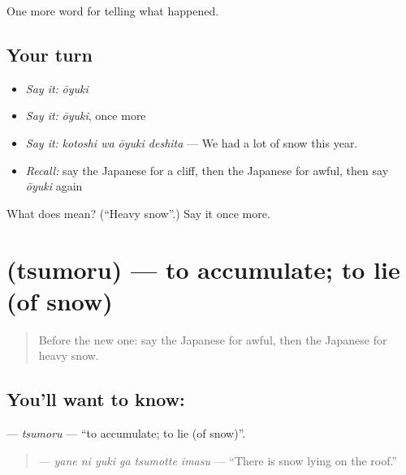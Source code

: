 \begin{grammarlens}[title={What you've built}]
One more word for telling what happened.
\end{grammarlens}

\subsection*{Your turn}
\begin{itemize}
\raggedright
  \item \emph{Say it:} \emph{ōyuki}
  \item \emph{Say it:} \emph{ōyuki}, once more
  \item \emph{Say it:} \emph{kotoshi wa ōyuki deshita} — We had a lot of snow this year.
  \item \emph{Recall:} say the Japanese for a cliff, then the Japanese for awful, then say \emph{ōyuki} again
\end{itemize}

\begin{tcolorbox}[breakable,colback=teal!4,colframe=teal!35!black,title={Before you move on}]
What does  mean? (\textquotedblleft{}Heavy snow\textquotedblright{}.) Say it once more.
\end{tcolorbox}
\section[\texorpdfstring{\ja{つもる} (tsumoru)}{つもる (tsumoru)}]{ (tsumoru) — to accumulate; to lie (of snow)}

\label{lesson:JA-C277-tsumoru}



\begin{quote}
Before the new one: say the Japanese for awful, then the Japanese for heavy snow.
\end{quote}

\subsection*{You'll want to know: }
\textbf{} — \emph{tsumoru} — \textquotedblleft{}to accumulate; to lie (of snow)\textquotedblright{}.

\begin{quote}
\textbf{  } — \emph{yane ni yuki ga tsumotte imasu} — \textquotedblleft{}There is snow lying on the roof.\textquotedblright{}
\end{quote}


